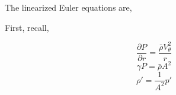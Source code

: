 The linearized Euler equations are,



First, recall,

\[\frac{\partial P}{\partial r} = \frac{\bar{\rho} V_{\theta}^2}{r} \]
\[\gamma P  = \bar{\rho}A^2\]
\[\rho' = \frac{1}{A^2} p'\]

